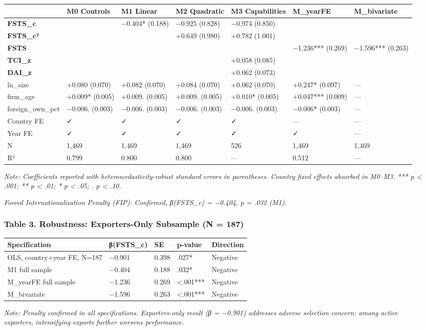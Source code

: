 \documentclass[12pt,a4paper]{article}
\begin{document}
\begin{longtable}[]{@{}lllllll@{}}
\toprule\noalign{}
& M0 Controls & M1 Linear & M2 Quadratic & M3 Capabilities & M\_yearFE &
M\_bivariate \\
\midrule\noalign{}
\endhead
\bottomrule\noalign{}
\endlastfoot
\textbf{FSTS\_c} & & −0.404* (0.188) & −0.925 (0.828) & −0.974 (0.850) &
& \\
\textbf{FSTS\_c²} & & & +0.649 (0.980) & +0.782 (1.001) & & \\
\textbf{FSTS} & & & & & −1.236*** (0.269) & −1.596*** (0.263) \\
\textbf{TCI\_z} & & & & +0.058 (0.085) & & \\
\textbf{DAI\_z} & & & & +0.062 (0.073) & & \\
ln\_size & +0.080 (0.070) & +0.082 (0.070) & +0.084 (0.070) & +0.062
(0.070) & +0.247* (0.097) & --- \\
firm\_age & +0.009* (0.005) & +0.009. (0.005) & +0.009. (0.005) &
+0.010* (0.005) & +0.047*** (0.009) & --- \\
foreign\_own\_pct & −0.006. (0.003) & −0.006. (0.003) & −0.006. (0.003)
& −0.006. (0.003) & −0.006* (0.003) & --- \\
Country FE & ✓ & ✓ & ✓ & ✓ & --- & --- \\
Year FE & ✓ & ✓ & ✓ & ✓ & ✓ & --- \\
N & 1,469 & 1,469 & 1,469 & 526 & 1,469 & 1,469 \\
R² & 0.799 & 0.800 & 0.800 & --- & 0.512 & --- \\
\end{longtable}

\emph{Note: Coefficients reported with heteroscedasticity-robust
standard errors in parentheses. Country fixed effects absorbed in
M0--M3. *** p \textless{} .001; ** p \textless{} .01; * p \textless{}
.05; . p \textless{} .10.}

\emph{Forced Internationalization Penalty (FIP): Confirmed, β(FSTS\_c) =
−0.404, p = .032 (M1).}

\hypertarget{table-3-robustness-exporters-only-subsample-n--187}{%
\subsubsection{Table 3. Robustness: Exporters-Only Subsample (N =
187)}\label{table-3-robustness-exporters-only-subsample-n--187}}

\begin{longtable}[]{@{}lllll@{}}
\toprule\noalign{}
Specification & β(FSTS\_c) & SE & p-value & Direction \\
\midrule\noalign{}
\endhead
\bottomrule\noalign{}
\endlastfoot
OLS, country+year FE, N=187 & −0.901 & 0.398 & .027* & Negative \\
M1 full sample & −0.404 & 0.188 & .032* & Negative \\
M\_yearFE full sample & −1.236 & 0.269 & \textless.001*** & Negative \\
M\_bivariate & −1.596 & 0.263 & \textless.001*** & Negative \\
\end{longtable}

\emph{Note: Penalty confirmed in all specifications. Exporters-only
result (β = −0.901) addresses adverse selection concern: among active
exporters, intensifying exports further worsens performance.}
\end{document}
